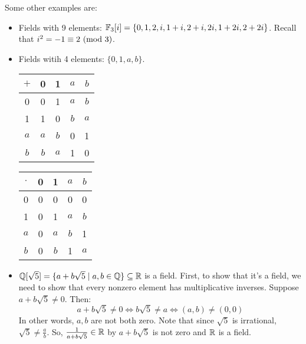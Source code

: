 \documentclass[letterpaper]{article}
\begin{document}
\bigskip 

Some other examples are: 
\begin{itemize}
    \item Fields with 9 elements: $\mathbb{F}_{3}[i] = \{0, 1, 2, i, 1 + i, 2 + i, 2i, 1 + 2i, 2 + 2i\}$. Recall that $i^2 = -1 \equiv 2 \ (\mathrm{mod}\ 3)$. 
    \item Fields witih 4 elements: $\{0, 1, a, b\}$. 
    \begin{center}
        \begin{tabular}{c|c c c c}
            $+$ & 0 & 1 & $a$ & $b$ \\  
            \hline 
            0   & 0 & 1 & $a$ & $b$ \\ 
            1   & 1 & 0 & $b$ & $a$ \\
            $a$ & $a$ & $b$ & 0 & 1 \\ 
            $b$ & $b$ & $a$ & 1 & 0
        \end{tabular}

        \begin{tabular}{c|c c c c}
            $\cdot$ & 0 & 1 & $a$ & $b$ \\ 
            \hline 
            0   & 0 & 0 & 0 & 0 \\ 
            1   & 0 & 1 & $a$ & $b$ \\
            $a$ & 0 & $a$ & $b$ & 1 \\ 
            $b$ & 0 & $b$ & 1 & $a$
        \end{tabular}
    \end{center}
    \item $\mathbb{Q}[\sqrt{5}] = \{a + b\sqrt{5} \mid a, b \in \mathbb{Q}\} \subseteq \mathbb{R}$ is a field. First, to show that it's a field, we need to show that every nonzero element has multiplicative inverses. Suppose $a + b\sqrt{5} \neq 0$. Then: 
    \[a + b\sqrt{5} \neq 0 \iff b\sqrt{5} \neq a \iff (a, b) \neq (0, 0)\]
    In other words, $a, b$ are not both zero. Note that since $\sqrt{5}$ is irrational, $\sqrt{5} \neq \frac{a}{b}$. So, $\frac{1}{a + b\sqrt{5}} \in \mathbb{R}$ by $a + b\sqrt{5}$ is not zero and $\mathbb{R}$ is a field. 
\end{itemize}
\end{document}
